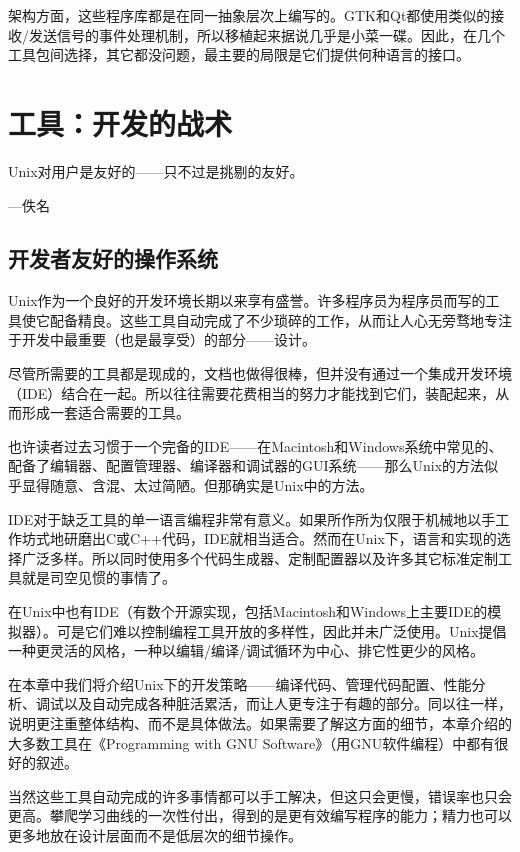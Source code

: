 \documentclass[12pt,oneside]{book}
\begin{document}
\begin{common-format}
架构方面，这些程序库都是在同一抽象层次上编写的。GTK和Qt都使用类似的接收/发送信号的事件处理机制，所以移植起来据说几乎是小菜一碟。因此，在几个工具包间选择，其它都没问题，最主要的局限是它们提供何种语言的接口。



\chapter{工具：开发的战术}
\begin{flushright}
\begin{notecard}{15em}
Unix对用户是友好的——只不过是挑剔的友好。

{\hfill —佚名}
\end{notecard}
\end{flushright}

\section{开发者友好的操作系统}
Unix作为一个良好的开发环境长期以来享有盛誉。许多程序员为程序员而写的工具使它配备精良。这些工具自动完成了不少琐碎的工作，从而让人心无旁骛地专注于开发中最重要（也是最享受）的部分——设计。

尽管所需要的工具都是现成的，文档也做得很棒，但并没有通过一个集成开发环境（IDE）结合在一起。所以往往需要花费相当的努力才能找到它们，装配起来，从而形成一套适合需要的工具。

也许读者过去习惯于一个完备的IDE——在Macintosh和Windows系统中常见的、配备了编辑器、配置管理器、编译器和调试器的GUI系统——那么Unix的方法似乎显得随意、含混、太过简陋。但那确实是Unix中的方法。

IDE对于缺乏工具的单一语言编程非常有意义。如果所作所为仅限于机械地以手工作坊式地研磨出C或C++代码，IDE就相当适合。然而在Unix下，语言和实现的选择广泛多样。所以同时使用多个代码生成器、定制配置器以及许多其它标准定制工具就是司空见惯的事情了。

在Unix中也有IDE（有数个开源实现，包括Macintosh和Windows上主要IDE的模拟器）。可是它们难以控制编程工具开放的多样性，因此并未广泛使用。Unix提倡一种更灵活的风格，一种以编辑/编译/调试循环为中心、排它性更少的风格。

在本章中我们将介绍Unix下的开发策略——编译代码、管理代码配置、性能分析、调试以及自动完成各种脏活累活，而让人更专注于有趣的部分。同以往一样，说明更注重整体结构、而不是具体做法。如果需要了解这方面的细节，本章介绍的大多数工具在《Programming with GNU Software》（用GNU软件编程）\cite{Loukides-Oram}中都有很好的叙述。

当然这些工具自动完成的许多事情都可以手工解决，但这只会更慢，错误率也只会更高。攀爬学习曲线的一次性付出，得到的是更有效编写程序的能力；精力也可以更多地放在设计层面而不是低层次的细节操作。


\end{common-format}
\end{document}

